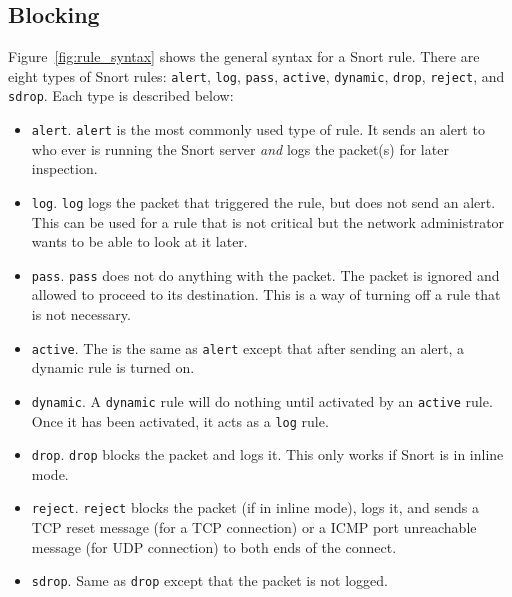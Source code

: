 
\subsection{Blocking}

Figure~\ref{fig:rule_syntax} shows the general syntax for a Snort rule. There are eight types of Snort rules: \texttt{alert}, \texttt{log}, \texttt{pass}, \texttt{active}, \texttt{dynamic}, \texttt{drop}, \texttt{reject}, and \texttt{sdrop}. Each type is described below:

\begin{itemize}
    \item \texttt{alert}.
        \texttt{alert} is the most commonly used type of rule. It sends an
        alert to who ever is running the Snort server \emph{and} logs the
        packet(s) for later inspection.

    \item \texttt{log}.
        \texttt{log} logs the packet that triggered the rule, but does not send
        an alert. This can be used for a rule that is not critical but the
        network administrator wants to be able to look at it later.

    \item \texttt{pass}.
        \texttt{pass} does not do anything with the packet. The packet is
        ignored and allowed to proceed to its destination. This is a way of
        turning off a rule that is not necessary.

    \item \texttt{active}.  The is the same as \texttt{alert} except that after
        sending an alert, a dynamic rule is turned on.

    \item \texttt{dynamic}.  A \texttt{dynamic} rule will do nothing until
        activated by an \texttt{active} rule. Once it has been activated, it
        acts as a \texttt{log} rule.

    \item \texttt{drop}.  \texttt{drop} blocks the packet and logs it. This
        only works if Snort is in inline mode.

    \item \texttt{reject}.
        \texttt{reject} blocks the packet (if in inline mode), logs it, and
        sends a TCP reset message (for a TCP connection) or a ICMP port
        unreachable message (for UDP connection) to both ends of the connect.

    \item \texttt{sdrop}.
        Same as \texttt{drop} except that the packet is not logged.
\end{itemize}

